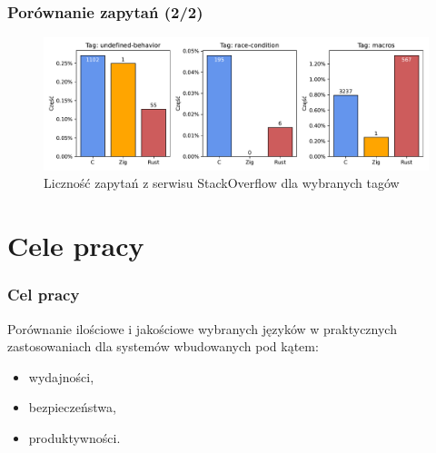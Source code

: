 \documentclass{beamer}
\begin{document}
\begin{frame}
	\frametitle{Porównanie zapytań (2/2)}

	\begin{figure}
		\includegraphics[width=\linewidth]{img/plots/issues-2.pdf}
		\caption{Liczność zapytań z serwisu StackOverflow dla wybranych tagów \cite{so-db}}
		\centering
	\end{figure}
\end{frame}

\section{Cele pracy}

\begin{frame}
	\frametitle{Cel pracy}
	Porównanie ilościowe i jakościowe wybranych języków w praktycznych
	zastosowaniach dla systemów wbudowanych pod kątem:

	\begin{itemize}
		\item wydajności,
		\item bezpieczeństwa,
		\item produktywności.
	\end{itemize}
\end{frame}
\end{document}
